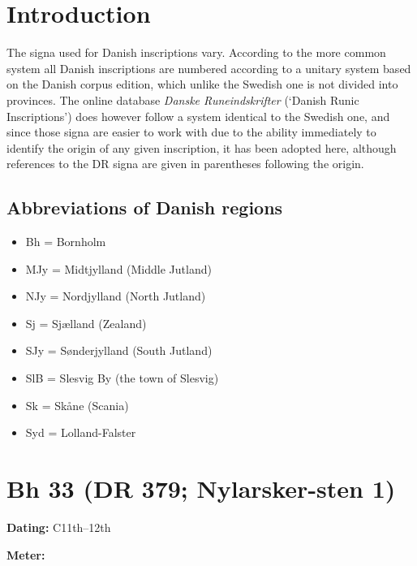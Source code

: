 
\section{Introduction}

The signa used for Danish inscriptions vary.  According to the more common system all Danish inscriptions are numbered according to a unitary system based on the Danish corpus edition, which unlike the Swedish one is not divided into provinces.  The online database \emph{Danske Runeindskrifter} (‘Danish Runic Inscriptions’) does however follow a system identical to the Swedish one, and since those signa are easier to work with due to the ability immediately to identify the origin of any given inscription, it has been adopted here, although references to the DR signa are given in parentheses following the origin.

\subsection{Abbreviations of Danish regions}

\begin{itemize}
  \item Bh = Bornholm
  \item MJy = Midtjylland (Middle Jutland)
  \item NJy = Nordjylland (North Jutland)
  \item Sj = Sjælland (Zealand)
  \item SJy = Sønderjylland (South Jutland)
  \item SlB = Slesvig By (the town of Slesvig)
  \item Sk = Skåne (Scania)
  \item Syd = Lolland-Falster

\end{itemize}

\sectionline

\newpage


\section{Bh 33 (DR 379; Nylarsker-sten 1)}

\begin{flushright}%
\textbf{Dating:} C11th--12th

\textbf{Meter:} \Fornyrdislag
\end{flushright}%

